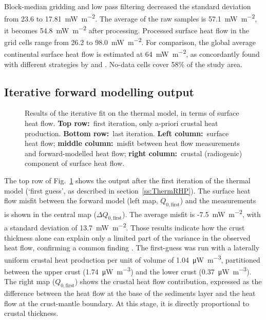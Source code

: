 {Block-median gridding and low pass filtering decreased the standard deviation from 23.6 to 17.81~\si{\milli \watt \per \square \metre}.
The average of the raw samples is 57.1~\si{\milli \watt \per \square \metre}, it becomes 54.8~\si{\milli \watt \per \square \metre} after processing.
Processed surface heat flow in the grid cells range from 26.2 to 98.0~\si{\milli \watt \per \square \metre}.
For comparison, the global average continental surface heat flow is estimated at 64~\si{\milli \watt \per \square \metre}, as concordantly found with different strategies by \textcite{Davies2010} and \textcite{Pollack1993}.
No-data cells cover 58\% of the study area.

\subsection{Iterative forward modelling output}
\label{ss:Appl:DiscTherm:FWD}

\begin{figure}
	\begin{adjustbox}{center}
	\end{adjustbox}
	\caption{Results of the iterative fit on the thermal model, in terms of surface heat flow. \textbf{Top row:}~first iteration, only a-priori crustal heat production. \textbf{Bottom row:}~last iteration. \textbf{Left column:}~surface heat flow; \textbf{middle column:}~misfit between heat flow measurements and forward-modelled heat flow; \textbf{right column:}~crustal (radiogenic) component of surface heat flow.}
	\label{fig:Qresults}
\end{figure}

The top row of Fig.~\ref{fig:Qresults} shows the output after the first iteration of the thermal model (`first guess', as described in section~\ref{ss:ThermRHP}).
The surface heat flow misfit between the forward model (left map, $Q_{0,\mathrm{first}}$) and the measurements is shown in the central map ($\Delta Q_{0,\mathrm{first}}$).
The average misfit is -7.5~\si{\milli \watt \per \square \metre}, with a standard deviation of 13.7~\si{\milli \watt \per \square \metre}.
Those results indicate how the crust thickness alone can explain only a limited part of the variance in the observed heat flow, confirming a common finding \parencite[e.g. ][]{Jaupart2016}.
The first-guess was run with a laterally uniform crustal heat production per unit of volume of \SI{1.04}{\micro \watt \per \cubic \metre}, partitioned between the upper crust (\SI{1.74}{\micro \watt \per \cubic \metre}) and the lower crust (\SI{0.37}{\micro \watt \per \cubic \metre}).
The right map ($Q_{0,\mathrm{first}}$) shows the crustal heat flow contribution, expressed as the difference between the heat flow at the base of the sediments layer and the heat flow at the crust-mantle boundary. 
At this stage, it is directly proportional to crustal thickness.

}
